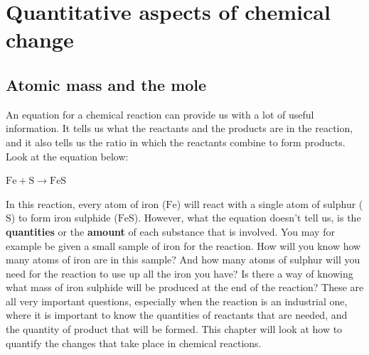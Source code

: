          \chapter{Quantitative aspects of chemical change}\label{chap:quanchem}
    \setcounter{figure}{1}
    \setcounter{subfigure}{1}
    \label{0044f0dab6cfd2ca2bac282dc4009886}
         \section{Atomic mass and the mole}
    \nopagebreak
      \label{m38717*id275167}An equation for a chemical reaction can provide us with a lot of useful information. It tells us what the reactants and the products are in the reaction, and it also tells us the ratio in which the reactants combine to form products. Look at the equation below:\par 
      \label{m38717*id275172}
        $\text{Fe}+\text{S}\to \text{FeS}$
      \par 
      \label{m38717*id275542}In this reaction, every atom of iron ($\text{Fe}$) will react with a single atom of sulphur ($\text{S}$) to form iron sulphide ($\text{FeS}$). However, what the equation doesn't tell us, is the \textbf{quantities} or the \textbf{amount} of each substance that is involved. You may for example be given a small sample of iron for the reaction. How will you know how many atoms of iron are in this sample? And how many atoms of sulphur will you need for the reaction to use up all the iron you have? Is there a way of knowing what mass of iron sulphide will be produced at the end of the reaction? These are all very important questions, especially when the reaction is an industrial one, where it is important to know the quantities of reactants that are needed, and the quantity of product that will be formed. This chapter will look at how to quantify the changes that take place in chemical reactions.\par 
    \label{m38717*cid2}
